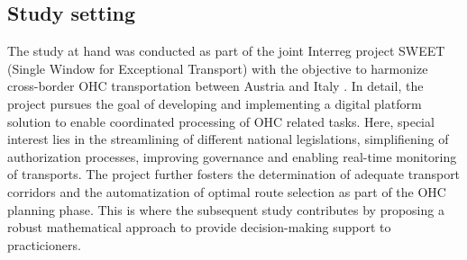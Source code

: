%
\subsection{Study setting}
The study at hand was conducted as part of the joint Interreg project SWEET (Single Window for Exceptional Transport) with the objective to harmonize cross-border OHC transportation between Austria and Italy \cite{Sweet}. In detail, the project pursues the goal of developing and implementing a digital platform solution to enable coordinated processing of OHC related tasks. Here, special interest lies in the streamlining of different national legislations, simplifiening of authorization processes, improving governance and enabling real-time monitoring of transports. The project further fosters the determination of adequate transport corridors and the automatization of optimal route selection as part of the OHC planning phase. This is where the subsequent study contributes by proposing a robust mathematical approach to provide decision-making support to practicioners.   


 

